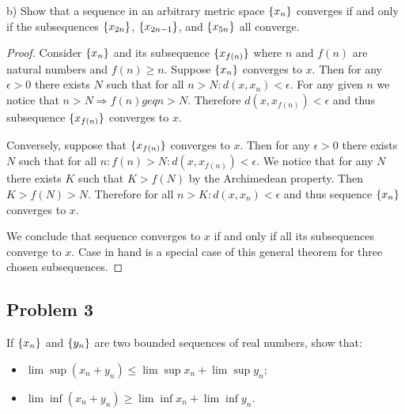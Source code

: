 \documentclass{article}
\DeclarePairedDelimiter{\set}{ \{ }{ \} }
\begin{document}
\begin{tcolorbox}
b) Show that a sequence in an arbitrary metric space $\set{x_n}$ converges if and only if the subsequences $\set{x_{2n}}$, $\set{x_{2n-1}}$, and $\set{x_{5n}}$ all converge.
\end{tcolorbox}

\begin{proof}

Consider $\set{x_{n}}$ and its subsequence $\set{x_{f(n)}}$ where $n$ and $f(n)$ are natural numbers and $f(n) \geq n$.
Suppose $\set{x_{n}}$ converges to $x$.
Then for any $\epsilon > 0$ there exists $N$ such that for all $n > N: d(x, x_n) < \epsilon$.
For any given $n$ we notice that $n>N \Rightarrow f(n) 
geq n > N$.
Therefore $d(x, x_{f(n)}) < \epsilon$ and thus subsequence $\set{x_{f(n)}}$ converges to $x$.

Conversely, suppose that $\set{x_{f(n)}}$ converges to $x$.
Then for any $\epsilon > 0$ there exists $N$ such that for all $n: f(n) > N: d(x, x_{f(n)}) < \epsilon$.
We notice that for any $N$ there exists $K$ such that $K > f(N)$ by the Archimedean property.
Then $K > f(N) > N$.
Therefore for all $n > K : d(x, x_n) < \epsilon$ and thus sequence $\set{x_n}$ converges to $x$.

We conclude that sequence converges to $x$ if and only if all its subsequences converge to $x$.
Case in hand is a special case of this general theorem for three chosen subsequences.

\end{proof}


\subsection*{Problem 3}

\begin{tcolorbox}
If $\set{x_n}$ and $\set{y_n}$ are two bounded sequences of real numbers, show that:
\begin{itemize}
    \item $\lim \sup (x_n + y_n) \leq \lim \sup x_n + \lim \sup y_n$;
    \item $\lim \inf (x_n + y_n) \geq \lim \inf x_n + \lim \inf y_n$.
\end{itemize}
\end{tcolorbox}
\end{document}
